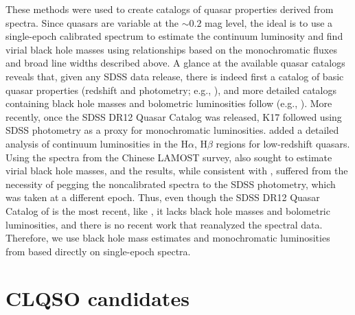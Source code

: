 \documentclass[twocolumn]{aastex62}
\begin{document}
These methods were used to create catalogs of quasar properties derived from spectra. Since quasars are variable at the ${\sim}0.2$ mag level, the ideal is to use a single-epoch calibrated spectrum to estimate the continuum luminosity and find virial black hole masses using relationships based on the monochromatic fluxes and broad line widths described above. A glance at the available quasar catalogs reveals that, given any SDSS data release, there is indeed first a catalog of basic quasar properties (redshift and photometry; e.g., \citealt{schneider2007, schneider2010}), and more detailed catalogs containing black hole masses and bolometric luminosities  follow (e.g., \citealt{shen2008, shen2011}). More recently, once the SDSS DR12 Quasar Catalog \citep{paris2017} was released,  K17 followed using SDSS photometry as a proxy for monochromatic luminosities. \citet{chen2018} added a detailed analysis of continuum luminosities in the  H$\alpha$, H$\beta$ regions for low-redshift quasars. Using the spectra from the Chinese LAMOST survey, \citet{dong2018} also sought to estimate virial black hole masses, and the results, while consistent with \citet{shen2011}, suffered from the necessity of pegging the noncalibrated spectra to the SDSS photometry, which was taken at a different epoch. Thus, even though the SDSS DR12 Quasar Catalog of \citet{paris2018}  is the most recent, like \citet{paris2017}, it lacks black hole masses and bolometric luminosities, and there is no recent work that reanalyzed the spectral data. Therefore, we use black hole mass estimates and monochromatic luminosities from \citet{shen2011} based directly on single-epoch spectra. 



\section{CLQSO candidates}
\label{app:clqso_cands}
\end{document}
